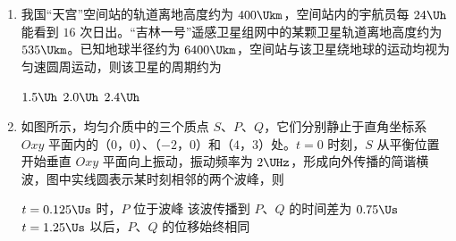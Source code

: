\documentclass[\gkver]{gaokaozhenti}
\begin{document}
\begin{enumerate}
{②}
{③}
{④}


\item
我国“天宫”空间站的轨道离地高度约为 $ 400 \Ukm $，空间站内的宇航员每 $ 24 \Uh $ 能看到 $ 16 $ 次日出。“吉林一号”遥感卫星组网中的某颗卫星轨道离地高度约为 $ 535 \Ukm $。已知地球半径约为 $ 6400 \Ukm $，空间站与该卫星绕地球的运动均视为匀速圆周运动，则该卫星的周期约为 


\fourchoices[answer=B]
{$ 1.0\Uh $}
{$ 1.5\Uh $}
{$ 2.0\Uh $}
{$ 2.4\Uh $}


\item
如图所示，均匀介质中的三个质点 $ S $、$ P $、$ Q $，它们分别静止于直角坐标系 $ Oxy $ 平面内的（$ 0 $，$ 0 $）、（$ - 2 $，$ 0 $）和（$ 4 $，$ 3 $）处。$ t =0 $ 时刻，$ S $ 从平衡位置开始垂直 $ Oxy $ 平面向上振动，振动频率为 $ 2 \UHz $，形成向外传播的简谐横波，图中实线圆表示某时刻相邻的两个波峰，则 
\onepicture[w=5.80cm]{}

{$ t =0.125 \Us $ 时，$ P $ 位于波峰}
{该波传播到 $ P $、$ Q $ 的时间差为 $ 0.75 \Us $}
{$ t =1.25 \Us $ 以后，$ P $、$ Q $ 的位移始终相同}


\end{enumerate}
\end{document}
